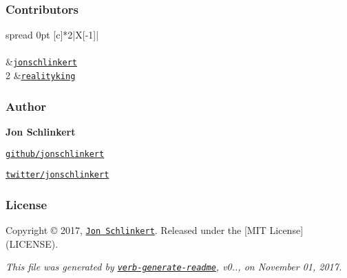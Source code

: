 \subsubsection*{Contributors}

\tabulinesep=1mm
\begin{longtabu} spread 0pt [c]{*{2}{|X[-1]}|}
\hline
\rowcolor{\tableheadbgcolor}\\
\endfirsthead
\hline
\endfoot
\hline
\rowcolor{\tableheadbgcolor}\\
  &\href{https://github.com/jonschlinkert}{\tt jonschlinkert}   \\
2  &\href{https://github.com/realityking}{\tt realityking}   \\
\end{longtabu}


\subsubsection*{Author}

{\bfseries Jon Schlinkert}


\begin{DoxyItemize}
\item \href{https://github.com/jonschlinkert}{\tt github/jonschlinkert}
\item \href{https://twitter.com/jonschlinkert}{\tt twitter/jonschlinkert}
\end{DoxyItemize}

\subsubsection*{License}

Copyright © 2017, \href{https://github.com/jonschlinkert}{\tt Jon Schlinkert}. Released under the \mbox{[}M\+IT License\mbox{]}(L\+I\+C\+E\+N\+SE).





{\itshape This file was generated by \href{https://github.com/verbose/verb-generate-readme}{\tt verb-\/generate-\/readme}, v0.., on November 01, 2017.} 